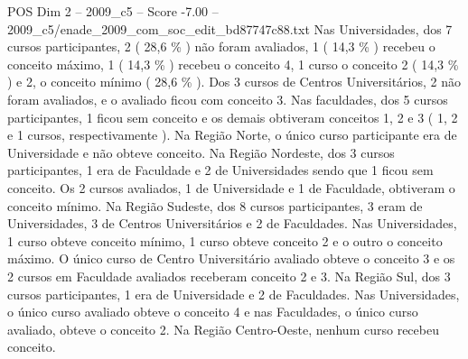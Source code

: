 \begin{textsample}{POS Dim 2 – 2009\_c5 – Score -7.00 – 2009\_c5/enade\_2009\_com\_soc\_edit\_bd87747c88.txt}
Nas Universidades, dos 7 cursos participantes, 2 ( 28,6 \% ) não foram avaliados, 1 ( 14,3 \% ) recebeu o conceito máximo, 1 ( 14,3 \% ) recebeu o conceito 4, 1 curso o conceito 2 ( 14,3 \% ) e 2, o conceito mínimo ( 28,6 \% ).
Dos 3 cursos de Centros Universitários, 2 não foram avaliados, e o avaliado ficou com conceito 3.
Nas faculdades, dos 5 cursos participantes, 1 ficou sem conceito e os demais obtiveram conceitos 1, 2 e 3 ( 1, 2 e 1 cursos, respectivamente ).
Na Região Norte, o único curso participante era de Universidade e não obteve conceito.
Na Região Nordeste, dos 3 cursos participantes, 1 era de Faculdade e 2 de Universidades sendo que 1 ficou sem conceito.
Os 2 cursos avaliados, 1 de Universidade e 1 de Faculdade, obtiveram o conceito mínimo.
Na Região Sudeste, dos 8 cursos participantes, 3 eram de Universidades, 3 de Centros Universitários e 2 de Faculdades.
Nas Universidades, 1 curso obteve conceito mínimo, 1 curso obteve conceito 2 e o outro o conceito máximo.
O único curso de Centro Universitário avaliado obteve o conceito 3 e os 2 cursos em Faculdade avaliados receberam conceito 2 e 3.
Na Região Sul, dos 3 cursos participantes, 1 era de Universidade e 2 de Faculdades.
Nas Universidades, o único curso avaliado obteve o conceito 4 e nas Faculdades, o único curso avaliado, obteve o conceito 2.
Na Região Centro-Oeste, nenhum curso recebeu conceito.

\end{textsample}
